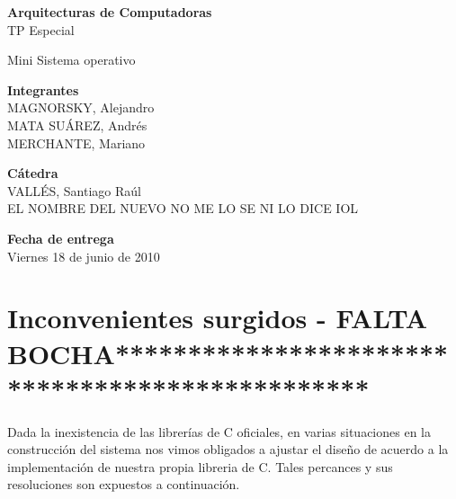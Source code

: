 \documentclass[12pt, a4paper, spanish]{report}
\begin{document}
\begin{center}
\textbf{\LARGE{Arquitecturas de Computadoras}}\\
\large{TP Especial}\par \noindent \newline \newline
\large{Mini Sistema operativo}
\end{center}
\par \noindent \newline \newline \newline \newline \newline \newline \newline \newline \newline \newline \newline
\newline \newline \newline \newline \newline
\large{\textbf{Integrantes}}\\
\indent \small{MAGNORSKY, Alejandro}\\
\indent \small{MATA SU\'AREZ, Andr\'es}\\
\indent \small{MERCHANTE, Mariano}\newline
\par \noindent
\large{\textbf{C\'atedra}}\\
\indent \small{VALL\'ES, Santiago Ra\'ul}\\
\indent \small{EL NOMBRE DEL NUEVO NO ME LO SE NI LO DICE IOL}\newline
\par \noindent
\large{\textbf{Fecha de entrega}}\\
\indent \small{Viernes 18 de junio de 2010}

\tableofcontents

\chapter*{Inconvenientes surgidos - FALTA BOCHA************************************************}
\indent Dada la inexistencia de las librer\'ias de C oficiales, en varias situaciones en la construcci\'on del sistema nos vimos
obligados a ajustar el dise\~no de acuerdo a la implementaci\'on de nuestra propia libreria de C. Tales percances y sus resoluciones
son expuestos a continuaci\'on.\\
\end{document}
